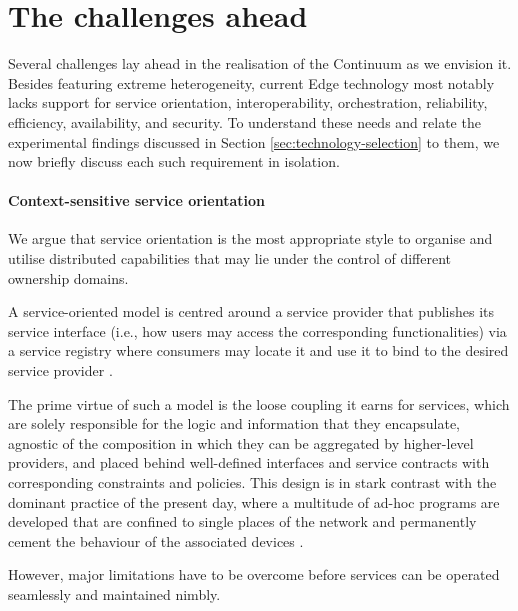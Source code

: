\section{The challenges ahead}
\label{sec:challenges}

Several challenges lay ahead in the realisation of the Continuum as we envision it. 
Besides featuring extreme heterogeneity, current Edge technology most notably lacks support for service orientation, interoperability, orchestration, reliability, efficiency, availability, and security.
To understand these needs and relate the experimental findings discussed in Section \ref{sec:technology-selection} to them, we now briefly discuss each such requirement in isolation. 

\paragraph{Context-sensitive service orientation}
We argue that service orientation is the most appropriate style to organise and utilise distributed capabilities that may lie under the control of different ownership domains. 

A service-oriented model is centred around a service provider that publishes its service interface (i.e., how users may access the corresponding functionalities) via a service registry where consumers may locate it and use it to bind to the desired service provider \cite{haller2008internet}.

The prime virtue of such a model is the loose coupling it earns for services, which are solely responsible for the logic and information that they encapsulate, agnostic of the composition in which they can be aggregated by higher-level providers, and placed behind well-defined interfaces and service contracts with corresponding constraints and policies.
This design is in stark contrast with the dominant practice of the present day, where a multitude of ad-hoc programs are developed that are confined to single places of the network and permanently cement the behaviour of the associated devices \cite{beckman2020harnessing}.

However, major limitations have to be overcome before services can be operated seamlessly and maintained nimbly.  

